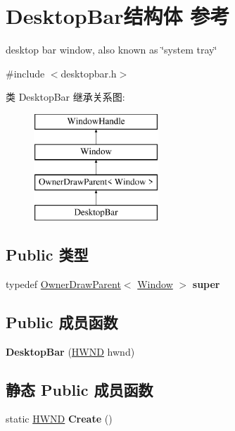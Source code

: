 \hypertarget{struct_desktop_bar}{}\section{Desktop\+Bar结构体 参考}
\label{struct_desktop_bar}


desktop bar window, also known as \char`\"{}system tray\char`\"{}  




{\ttfamily \#include $<$desktopbar.\+h$>$}

类 Desktop\+Bar 继承关系图\+:\begin{figure}[H]
\begin{center}
\leavevmode
\includegraphics[height=4.000000cm]{struct_desktop_bar}
\end{center}
\end{figure}
\subsection*{Public 类型}
\begin{DoxyCompactItemize}
\item 
\mbox{\label{struct_desktop_bar_a839613b1cc5458c2bf3a730dff0f70c8}} 
typedef \hyperlink{struct_owner_draw_parent}{Owner\+Draw\+Parent}$<$ \hyperlink{struct_window}{Window} $>$ {\bfseries super}
\end{DoxyCompactItemize}
\subsection*{Public 成员函数}
\begin{DoxyCompactItemize}
\item 
\mbox{\label{struct_desktop_bar_ad209df8c99d07cdb580e0cc66c423b79}} 
{\bfseries Desktop\+Bar} (\hyperlink{interfacevoid}{H\+W\+ND} hwnd)
\end{DoxyCompactItemize}
\subsection*{静态 Public 成员函数}
\begin{DoxyCompactItemize}
\item 
\mbox{\label{struct_desktop_bar_af2eab6394a1c8c97fe094d012f4691ba}} 
static \hyperlink{interfacevoid}{H\+W\+ND} {\bfseries Create} ()
\end{DoxyCompactItemize}
